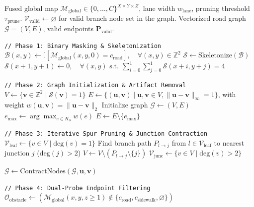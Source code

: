 \begin{algorithm}[h]
\caption{Branch point detection / topology extraction}
\label{alg:branch_detection}
\begin{algorithmic}[1]
\Require Fused global map $\mathcal{M}_{\text{global}} \in \{0, \dots, C\}^{X \times Y \times Z}$, lane width $w_{\text{lane}}$, pruning threshold $\tau_{\text{prune}}$. $\mathcal{V}_{\text{valid}} \gets \varnothing$ for valid branch node set in the graph. 
\Ensure Vectorized road graph $\mathcal{G} = (V, E)$, valid endpoints $\mathbf{P}_{\text{valid}}$.


\State \texttt{// Phase 1: Binary Masking \& Skeletonization}
\State $\mathcal{B}(x,y) \gets \mathbb{I}[\mathcal{M}_{\text{global}}(x, y, 0) = c_{\text{road}}], \quad \forall (x,y) \in \mathbb{Z}^2$
\State $\mathcal{S} \gets \text{Skeletonize}(\mathcal{B})$
\State $\mathcal{S}(x+1, y+1) \gets 0, \quad \forall (x,y) \text{ s.t. } \sum_{i=0}^{1} \sum_{j=0}^{1} \mathcal{S}(x+i, y+j) = 4$ 

\State \texttt{// Phase 2: Graph Initialization \& Artifact Removal}
\State $V \gets \{ \mathbf{v} \in \mathbb{Z}^2 \mid \mathcal{S}(\mathbf{v}) = 1 \}$
\State $E \gets \{ (\mathbf{u}, \mathbf{v}) \mid \mathbf{u}, \mathbf{v} \in V, \|\mathbf{u} - \mathbf{v}\|_{\infty} = 1 \}$, with weight $w(\mathbf{u}, \mathbf{v}) = \|\mathbf{u} - \mathbf{v}\|_2$
\State Initialize graph $\mathcal{G} \gets (V, E)$
    \State $e_{\text{max}} \gets \arg\max_{e \in K_3} w(e)$
    \State $E \gets E \setminus \{e_{\text{max}}\}$ 
\EndFor

\State \texttt{// Phase 3: Iterative Spur Pruning \& Junction Contraction}
\Repeat
    \State $\mathcal{V}_{\text{leaf}} \gets \{v \in V \mid \text{deg}(v) = 1 \}$
    \State Find branch path $P_{l \to j}$ from $l \in \mathcal{V}_{\text{leaf}}$ to nearest junction $j$ ($\text{deg}(j) > 2$)
        \State $V \gets V \setminus (P_{l \to j} \setminus \{j\})$ 
    \EndIf
{}
\State $\mathcal{V}_{\text{junc}} \gets \{v \in V \mid \text{deg}(v) > 2 \}$

    \State $\mathcal{G} \gets \text{ContractNodes}(\mathcal{G}, \mathbf{u}, \mathbf{v})$ 
\EndFor

\State \texttt{// Phase 4: Dual-Probe Endpoint Filtering}
\State $\mathcal{O}_{\text{obstacle}} \gets (\mathcal{M}_{\text{global}}(x,y,z \ge 1) \notin \{c_{\text{road}}, c_{\text{sidewalk}}, \varnothing\})$


\end{algorithmic}
\end{algorithm}
